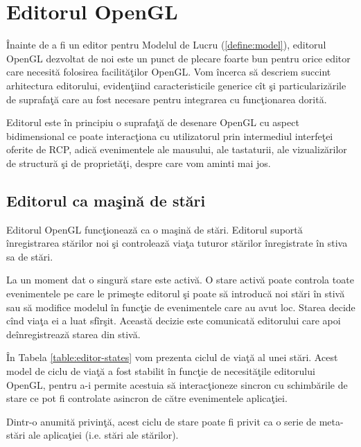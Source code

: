 \section{Editorul OpenGL}
\label{section:opengl-editor}

Înainte de a fi un editor pentru Modelul de Lucru (\ref{define:model}), 
editorul OpenGL dezvoltat de noi este un punct de plecare foarte bun pentru 
orice editor care necesită folosirea facilităţilor OpenGL. Vom încerca să 
descriem succint arhitectura editorului, evidenţiind caracteristicile generice 
cît şi particularizările de suprafaţă care au fost necesare pentru integrarea 
cu funcţionarea dorită.

Editorul este în principiu o suprafaţă de desenare OpenGL cu aspect 
bidimensional ce poate interacţiona cu utilizatorul prin intermediul interfeţei 
oferite de RCP, adică evenimentele ale mausului, ale tastaturii, ale 
vizualizărilor de structură şi de proprietăţi, despre care vom aminti mai jos.


\subsection{Editorul ca maşină de stări}

Editorul OpenGL funcţionează ca o maşină de stări. Editorul suportă 
înregistrarea stărilor noi şi controlează viaţa tuturor stărilor înregistrate 
în stiva sa de stări.

La un moment dat o singură stare este activă. O stare activă poate controla 
toate evenimentele pe care le primeşte editorul şi poate să introducă noi stări 
în stivă sau să modifice modelul în funcţie de evenimentele care au avut loc. 
Starea decide cînd viaţa ei a luat sfîrşit. Această decizie este comunicată 
editorului care apoi deînregistrează starea din stivă.

În Tabela \ref{table:editor-states} vom prezenta ciclul de viaţă al unei stări. 
Acest model de ciclu de viaţă a fost stabilit în funcţie de necesităţile 
editorului OpenGL, pentru a-i permite acestuia să interacţioneze sincron cu 
schimbările de stare ce pot fi controlate asincron de către evenimentele 
aplicaţiei.

Dintr-o anumită privinţă, acest ciclu de stare poate fi privit ca o serie de 
meta-stări ale aplicaţiei (i.e. stări ale stărilor).

